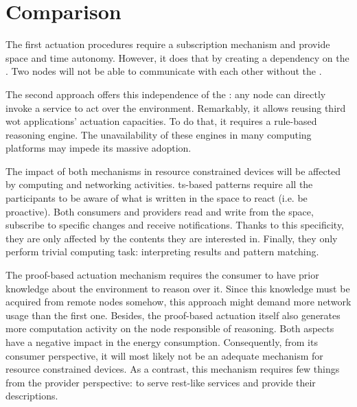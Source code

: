 
\section{Comparison}

The first actuation procedures require a subscription mechanism and provide space and time autonomy.
However, it does that by creating a dependency on the \Space{}.
Two nodes will not be able to communicate with each other without the \Space{}.


The second approach offers this independence of the \Space{}: any node can directly invoke a service to act over the environment.
Remarkably, it allows reusing third \ac{wot} applications' actuation capacities. %
To do that, it requires a rule-based reasoning engine. %
The unavailability of these engines in many computing platforms may impede its massive adoption. %





\bigskip

The impact of both mechanisms in resource constrained devices will be affected by computing and networking activities.
\ac{ts}-based patterns require all the participants to be aware of what is written in the space to react (i.e. be proactive).
Both consumers and providers read and write from the space, subscribe to specific changes and receive notifications.
Thanks to this specificity, they are only affected by the contents they are interested in. %
Finally, they only perform trivial computing task: interpreting results and pattern matching. %


The proof-based actuation mechanism requires the consumer to have prior knowledge about the environment to reason over it. %
Since this knowledge must be acquired from remote nodes somehow, this approach might demand more network usage than the first one.
Besides, the proof-based actuation itself also generates more computation activity on the node responsible of reasoning.
Both aspects have a negative impact in the energy consumption.
Consequently, from its consumer perspective, it will most likely not be an adequate mechanism for resource constrained devices.
As a contrast, this mechanism requires few things from the provider perspective: to serve \ac{rest}-like services and provide their descriptions. %



